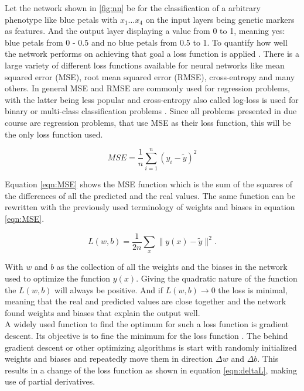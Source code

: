 Let the network shown in \ref{fig:nn} be for the classification of a arbitrary phenotype like blue petals with
$x_1 \dots x_4$ on the input layers being genetic markers as features. And the output layer displaying a value
from 0 to 1, meaning yes: blue petals from 0 - 0.5 and no blue petals from 0.5 to 1. To quantify how well the
network performs on achieving that goal a loss function is applied \cite{schmidhuber2015deep}. There is a
large variety of different loss functions available for neural networks like mean squared error (MSE), root
mean squared error (RMSE), cross-entropy and many others. In general MSE and RMSE are commonly used for regression
problems, with the latter being less popular and cross-entropy also called log-loss is used for binary or
multi-class classification problems \cite{janocha2017loss}. Since all problems presented in due course are
regression problems, that use MSE as their loss function, this will be the only loss function used.

\begin{equation}
 MSE = \frac{1}{n} \sum_{i=1}^n (y_i - \widetilde{y})^2
 \label{eqn:MSE}
\end{equation}

Equation \ref{eqn:MSE} shows the MSE function which is the sum of the squares of the differences of all the
predicted and the real values. The same function can be rewritten with the previously used terminology of
weights and biases in equation \ref{eqn:MSE}.

\begin{equation}
  L(w,b) =  \frac{1}{2n} \sum_x \| y(x) - \widetilde{y}\|^2.
 \label{eqn:MSE2}
\end{equation}

With $w$ and $b$ as the collection of all the weights and the biases in the network used to optimize the
function $y(x)$. Giving the quadratic nature of the function the $L(w,b)$ will always be positive. And if
$L(w,b) \rightarrow 0$ the loss is minimal, meaning that the real and predicted values are close together and
the network found weights and biases that explain the output well. \\
A widely used function to find the optimum for such a loss function is gradient descent. Its objective is to
fine the minimum for the loss function \cite{bottou1991stochastic}.  The behind gradient descent or other
optimizing algorithms is start with randomly initialized weights and biases and repeatedly move them in
direction $\Delta w$ and $\Delta b$. This results in a change of the loss function as shown in equation
\ref{eqn:deltaL}, making use of partial derivatives.

